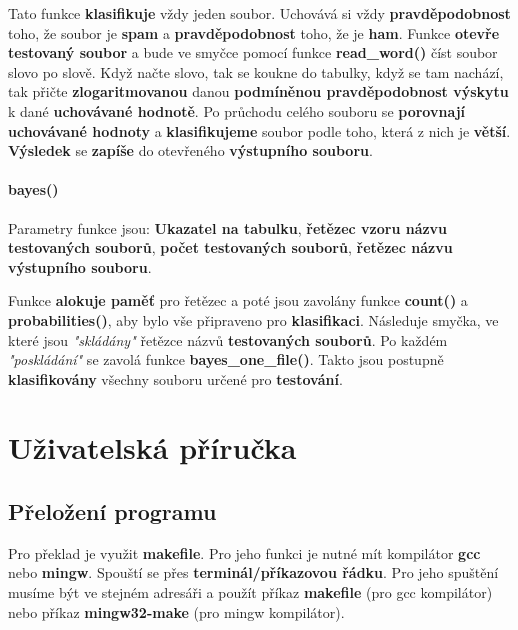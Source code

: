 \documentclass[12pt]{report}
\begin{document}
			Tato funkce \textbf{klasifikuje} vždy jeden soubor. Uchovává si vždy \textbf{pravděpodobnost} toho, že soubor je \textbf{spam} a \textbf{pravděpodobnost} toho, že je \textbf{ham}. Funkce \textbf{otevře testovaný soubor} a bude ve smyčce pomocí funkce \textbf{read\_word()} číst soubor slovo po slově. Když načte slovo, tak se koukne do tabulky, když se tam nachází, tak přičte \textbf{zlogaritmovanou} danou \textbf{podmíněnou pravděpodobnost výskytu} k dané \textbf{uchovávané hodnotě}. Po průchodu celého souboru se \textbf{porovnají uchovávané hodnoty} a \textbf{klasifikujeme} soubor podle toho, která z nich je \textbf{větší}. \textbf{Výsledek} se \textbf{zapíše} do otevřeného \textbf{výstupního souboru}.
			
			\subsubsection{bayes()}
			
			Parametry funkce jsou: \textbf{Ukazatel na tabulku}, \textbf{řetězec vzoru názvu testovaných souborů}, \textbf{počet testovaných souborů}, \textbf{řetězec názvu výstupního souboru}.
			
			
			Funkce \textbf{alokuje paměť} pro řetězec a poté jsou zavolány funkce \textbf{count()} a \textbf{probabilities()}, aby bylo vše připraveno pro \textbf{klasifikaci}. Následuje smyčka, ve které jsou \textit{"skládány"} řetězce názvů \textbf{testovaných souborů}. Po každém \textit{"poskládání"} se zavolá funkce \textbf{bayes\_one\_file()}. Takto jsou postupně \textbf{klasifikovány} všechny souboru určené pro \textbf{testování}.
			
			
	\chapter{Uživatelská příručka }
		
		\section{Přeložení programu}
		
			Pro překlad je využit \textbf{makefile}. Pro jeho funkci je nutné mít kompilátor \textbf{gcc} nebo \textbf{mingw}. Spouští se přes \textbf{terminál/příkazovou řádku}.
			Pro jeho spuštění musíme být ve stejném adresáři a použít příkaz \textbf{makefile} (pro gcc kompilátor) nebo příkaz \textbf{mingw32-make} (pro mingw kompilátor).
			
\end{document}
